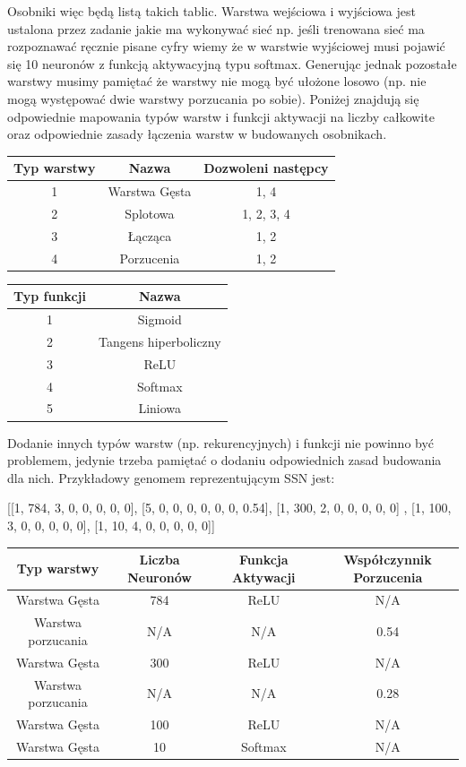 \documentclass{article}
\begin{document}
Osobniki więc będą listą takich tablic.
Warstwa wejściowa i wyjściowa jest ustalona 
przez zadanie jakie ma wykonywać sieć np. jeśli trenowana sieć ma rozpoznawać ręcznie pisane
cyfry wiemy że w warstwie  wyjściowej musi pojawić się 10 neuronów z funkcją aktywacyjną
typu softmax.
Generując jednak pozostałe warstwy musimy pamiętać że warstwy nie mogą być ułożone losowo
(np. nie mogą występować dwie warstwy porzucania po sobie). Poniżej znajdują się odpowiednie
mapowania typów warstw i funkcji aktywacji na liczby całkowite oraz odpowiednie zasady 
łączenia warstw w budowanych osobnikach.
\begin{tabular}{|c|c|c|}
	\hline
	Typ warstwy & Nazwa & Dozwoleni następcy \\
	\hline
	1 & Warstwa Gęsta & 1, 4\\
	2 & Splotowa & 1, 2, 3, 4\\
	3 & Łącząca & 1, 2\\
	4 & Porzucenia & 1, 2 \\
	\hline
\end{tabular}
\quad
\begin{tabular}{|c|c|}
	\hline
	Typ funkcji & Nazwa\\
	\hline
	1 & Sigmoid \\
	2 & Tangens hiperboliczny \\
	3 & ReLU \\
	4 & Softmax \\
	5 & Liniowa \\
	\hline
\end{tabular}

Dodanie innych typów warstw (np. rekurencyjnych) i funkcji nie powinno być problemem, jedynie
trzeba pamiętać o dodaniu odpowiednich zasad budowania dla nich.
Przykładowy genomem reprezentującym SSN jest:
\begin{center}
	[[1, 784, 3, 0, 0, 0, 0, 0], [5, 0, 0, 0, 0, 0, 0, 0.54], [1, 300, 2, 0, 0, 0, 0, 0] 
	\newline
	  [5, 0, 0, 0, 0, 0, 0, 0.28], [1, 100, 3, 0, 0, 0, 0, 0], [1, 10, 4, 0, 0, 0, 0, 0]]
\end{center}
\begin{tabular}{|c|c|c|c|}
	\hline
	Typ warstwy & Liczba Neuronów & Funkcja Aktywacji & Współczynnik Porzucenia \\
	\hline
	Warstwa Gęsta & 784 & ReLU & N/A \\
	Warstwa porzucania & N/A & N/A & 0.54\\
	Warstwa Gęsta & 300 & ReLU & N/A \\
	Warstwa porzucania & N/A & N/A & 0.28\\
	Warstwa Gęsta & 100 & ReLU & N/A \\
	Warstwa Gęsta & 10 & Softmax & N/A \\
	\hline
\end{tabular}
\end{document}
